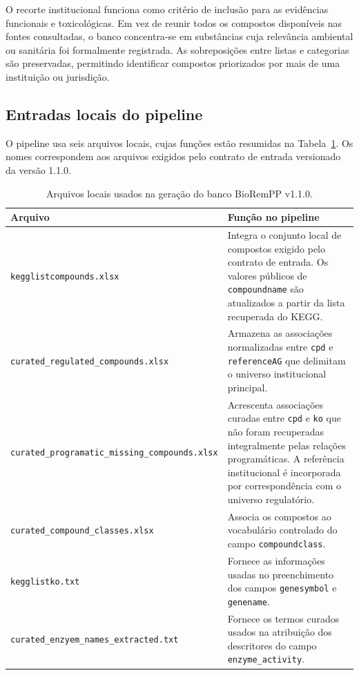 O recorte institucional funciona como critério de inclusão para as evidências funcionais e toxicológicas. Em vez de reunir todos os compostos disponíveis nas fontes consultadas, o banco concentra-se em substâncias cuja relevância ambiental ou sanitária foi formalmente registrada. As sobreposições entre listas e categorias são preservadas, permitindo identificar compostos priorizados por mais de uma instituição ou jurisdição.

\subsection{Entradas locais do pipeline}

O pipeline usa seis arquivos locais, cujas funções estão resumidas na Tabela~\ref{tab:c1-local-inputs}. Os nomes correspondem aos arquivos exigidos pelo contrato de entrada versionado da versão 1.1.0.

\begin{table}[htbp]
\centering
\caption{Arquivos locais usados na geração do banco BioRemPP v1.1.0.}
\label{tab:c1-local-inputs}
\small
\begin{tabularx}{\textwidth}{@{}lX@{}}
\toprule
\textbf{Arquivo} & \textbf{Função no pipeline} \\
\midrule
\texttt{kegglistcompounds.xlsx}
& Integra o conjunto local de compostos exigido pelo contrato de entrada. Os valores públicos de \texttt{compoundname} são atualizados a partir da lista recuperada do KEGG. \\

\texttt{curated\_regulated\_compounds.xlsx}
& Armazena as associações normalizadas entre \texttt{cpd} e \texttt{referenceAG} que delimitam o universo institucional principal. \\

\texttt{curated\_programatic\_missing\_compounds.xlsx}
& Acrescenta associações curadas entre \texttt{cpd} e \texttt{ko} que não foram recuperadas integralmente pelas relações programáticas. A referência institucional é incorporada por correspondência com o universo regulatório. \\

\texttt{curated\_compound\_classes.xlsx}
& Associa os compostos ao vocabulário controlado do campo \texttt{compoundclass}. \\

\texttt{kegglistko.txt}
& Fornece as informações usadas no preenchimento dos campos \texttt{genesymbol} e \texttt{genename}. \\

\texttt{curated\_enzyem\_names\_extracted.txt}
& Fornece os termos curados usados na atribuição dos descritores do campo \texttt{enzyme\_activity}. \\
\bottomrule
\end{tabularx}
\end{table}

